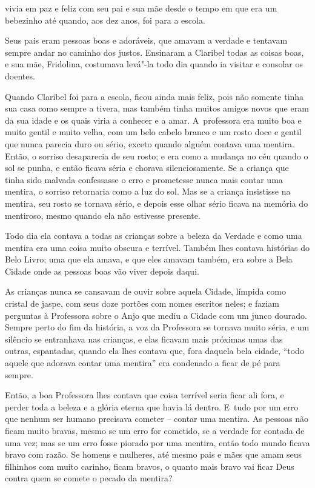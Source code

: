  

 vivia em paz e feliz com seu pai e sua mãe desde o tempo em que
era um bebezinho até quando, aos dez anos, foi para a escola.

Seus pais eram pessoas boas e adoráveis, que amavam a verdade e tentavam
sempre andar no caminho dos justos. Ensinaram a Claribel todas as
coisas boas, e sua mãe, Fridolina, costumava levá"-la todo dia quando ia
visitar e consolar os doentes.

Quando Claribel foi para a escola, ficou ainda mais feliz, pois não
somente tinha sua casa como sempre a tivera, mas também tinha muitos
amigos novos que eram da sua idade e os quais viria a conhecer e a amar.
A~professora era muito boa e muito gentil e muito velha, com um belo
cabelo branco e um rosto doce e gentil que nunca parecia duro ou sério,
exceto quando alguém contava uma mentira. Então, o sorriso desaparecia
de seu rosto; e era como a mudança no céu quando o sol se punha, e então
ficava séria e chorava silenciosamente. Se a criança que tinha sido
malvada confessasse o erro e prometesse nunca mais contar uma mentira, o
sorriso retornaria como a luz do sol. Mas se a criança insistisse na
mentira, seu rosto se tornava sério, e depois esse olhar sério ficava na
memória do mentiroso, mesmo quando ela não estivesse presente.

Todo dia ela contava a todas as crianças sobre a beleza da Verdade e como
uma mentira era uma coisa muito obscura e terrível. Também lhes
contava histórias do Belo Livro; uma que ela amava, e que eles amavam
também, era sobre a Bela Cidade onde as pessoas boas vão viver depois
daqui.

As crianças nunca se cansavam de ouvir sobre aquela Cidade, límpida como
cristal de jaspe, com seus doze portões com nomes escritos neles; e
faziam perguntas à Professora sobre o Anjo que mediu a Cidade com um
junco dourado. Sempre perto do fim da história, a voz da Professora se
tornava muito séria, e um silêncio se entranhava nas crianças, e elas
ficavam mais próximas umas das outras, espantadas, quando ela lhes contava
que, fora daquela bela cidade,
``todo aquele que adorava contar uma mentira'' era condenado a ficar de pé para sempre.

Então, a boa Professora lhes contava que coisa terrível seria ficar
ali fora, e perder toda a beleza e a glória eterna que havia lá dentro.
E~tudo por um erro que nenhum ser humano precisava cometer -- contar uma
mentira. As pessoas não ficam muito bravas, mesmo se um erro for
cometido, se a verdade for contada de uma vez; mas se um erro fosse
piorado por uma mentira, então todo mundo ficava bravo com razão. Se
homens e mulheres, até mesmo pais e mães que amam seus filhinhos com
muito carinho, ficam bravos, o quanto mais bravo vai ficar Deus contra
quem se comete o pecado da mentira?

